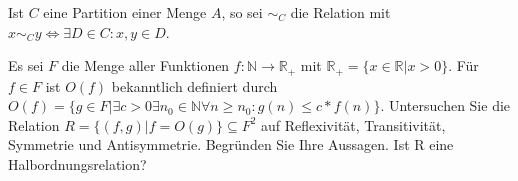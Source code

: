 \documentclass[10pt, a4paper]{exam}
\begin{document}
\begin{questions}

    \question Ist $C$ eine Partition einer Menge $A$, so sei $\sim_C$ die Relation mit $x\sim_C y\Leftrightarrow\exists D\in C: x, y\in D$.

    \question Es sei $F$ die Menge aller Funktionen $f:\mathbb{N}\rightarrow\mathbb{R}_{+}$ mit $\mathbb{R}_{+} = \{x\in\mathbb{R} | x > 0\}$.
    Für $f\in F$ ist $O(f)$ bekanntlich definiert durch $O(f)=\{g\in F | \exists c > 0 \exists n_0\in \mathbb{N}\forall n \geq n_0: g(n) \leq c * f(n)\}$.
    Untersuchen Sie die Relation $R=\{(f,g)|f= O(g)\} \subseteq F^2$ auf Reflexivität, Transitivität, Symmetrie und Antisymmetrie. Begründen Sie Ihre Aussagen. Ist R eine Halbordnungsrelation?
    \begin{solution}
    \end{solution}


\end{questions}
\end{document}
